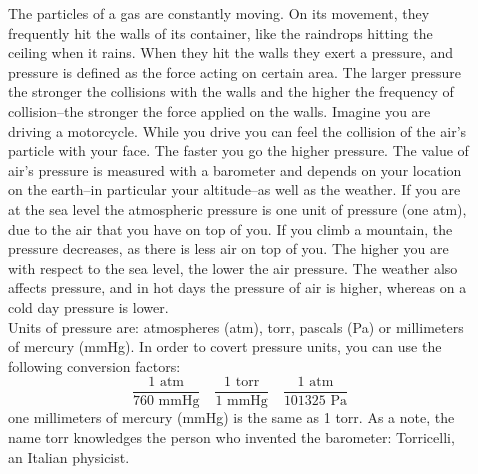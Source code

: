 \documentclass[main.tex]{subfiles}
\begin{document}
\begin{description}
\item[] The particles of a gas are constantly moving. On its movement, they frequently hit the walls of its container, like the raindrops hitting the ceiling when it rains. When they hit the walls they exert a pressure, and pressure is defined as the force acting on certain area. The larger pressure the stronger the collisions with the walls and the higher the frequency of collision--the stronger the force applied on the walls. Imagine you are driving a motorcycle. While you drive you can feel the collision of the air's particle with your face. The faster you go the higher pressure. 
The value of air's pressure is measured with a barometer and depends on your location on the earth--in particular your altitude--as well as the weather. If you are at the sea level the atmospheric pressure is one unit of pressure (one atm), due to the air that you have on top of you. If you climb a mountain, the pressure decreases, as there is less air on top of you. The higher you are with respect to the sea level, the lower the air pressure. The weather also affects pressure, and in hot days the pressure of air is higher, whereas on a cold day pressure is lower. \\
Units of pressure are: atmospheres (atm), torr, pascals (Pa) or millimeters of mercury (mmHg). In order to covert pressure units, you can use the following conversion factors:
\begin{equation*}
\boxed{   \frac{1 \text{ atm} }{760\text{ mmHg} }}\quad  \boxed{ \frac{1\text{ torr}}{1\text{ mmHg}}}\quad  \boxed{ \frac{1\text{ atm}}{101325\text{ Pa}}}   
\end{equation*}
one millimeters of mercury (mmHg) is the same as 1 torr. As a note, the name torr knowledges the person who invented the barometer: Torricelli, an Italian physicist.



\end{description}
\end{document}
